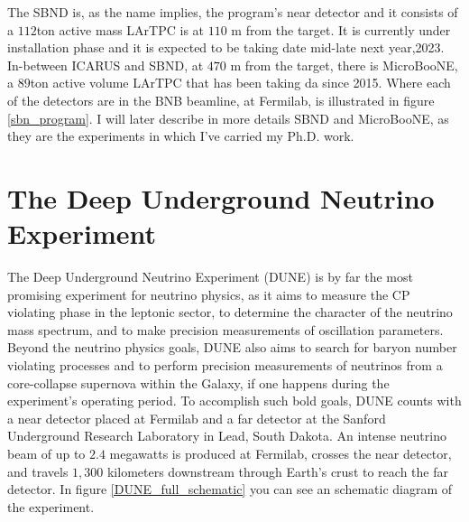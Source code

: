 The SBND is, as the name implies, the program's near detector and it consists of a $112$ton active mass LArTPC is at $110$ m from the target. It is currently under  installation phase and it is expected to be taking date mid-late next year,2023. In-between ICARUS and SBND, at $470$ m from the target, there is MicroBooNE, a $89$ton active volume LArTPC that has been taking da since 2015. Where each of the detectors are in the BNB beamline, at Fermilab, is illustrated in figure \ref{sbn_program}.
I will later describe in more details SBND and MicroBooNE, as they are the experiments in which I've carried my Ph.D. work. 

\section{The Deep Underground Neutrino Experiment}

The Deep Underground Neutrino Experiment (DUNE) is by far the most promising experiment for neutrino physics, as it aims to measure the CP violating phase in the leptonic sector, to determine the character of the neutrino mass spectrum, and to make precision measurements of oscillation parameters. Beyond the neutrino physics goals, DUNE also aims to search for baryon number violating processes and to perform precision measurements of neutrinos from a core-collapse supernova within the Galaxy, if one happens during the experiment's operating period. 
To accomplish such bold goals, DUNE counts with a near detector placed at Fermilab and a far detector at the Sanford Underground Research Laboratory in Lead, South Dakota. An intense neutrino beam of up to $2.4$ megawatts is produced at Fermilab, crosses the near detector, and travels $1,300$ kilometers downstream through Earth's crust to reach the far detector. In figure \ref{DUNE_full_schematic} you can see an schematic diagram of the experiment. 

